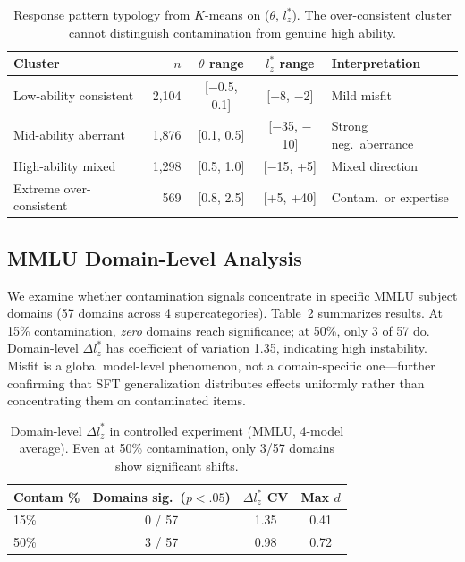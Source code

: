 \documentclass[11pt,a4paper]{article}
\begin{document}
\begin{table}[t]
\centering
\small
\begin{tabular}{lrccl}
\toprule
Cluster & $n$ & $\theta$ range & $l_{z}^{*}$ range & Interpretation \\
\midrule
Low-ability consistent & 2{,}104 & [$-$0.5, 0.1] & [$-$8, $-$2] & Mild misfit \\
Mid-ability aberrant & 1{,}876 & [0.1, 0.5] & [$-$35, $-$10] & Strong neg.\ aberrance \\
High-ability mixed & 1{,}298 & [0.5, 1.0] & [$-$15, +5] & Mixed direction \\
Extreme over-consistent & 569 & [0.8, 2.5] & [+5, +40] & Contam.\ or expertise \\
\bottomrule
\end{tabular}
\caption{Response pattern typology from $K$-means on ($\theta$, $l_{z}^{*}$). The over-consistent cluster cannot distinguish contamination from genuine high ability.}
\label{tab:typology}
\end{table}

\subsection{MMLU Domain-Level Analysis}

We examine whether contamination signals concentrate in specific MMLU subject domains (57 domains across 4 supercategories).
Table~\ref{tab:domain} summarizes results.
At 15\% contamination, \emph{zero} domains reach significance; at 50\%, only 3 of 57 do.
Domain-level $\Delta l_{z}^{*}$ has coefficient of variation 1.35, indicating high instability.
Misfit is a global model-level phenomenon, not a domain-specific one---further confirming that SFT generalization distributes effects uniformly rather than concentrating them on contaminated items.

\begin{table}[t]
\centering
\small
\begin{tabular}{lccc}
\toprule
Contam \% & Domains sig.\ ($p<.05$) & $\Delta l_{z}^{*}$ CV & Max $d$ \\
\midrule
15\% & 0 / 57 & 1.35 & 0.41 \\
50\% & 3 / 57 & 0.98 & 0.72 \\
\bottomrule
\end{tabular}
\caption{Domain-level $\Delta l_{z}^{*}$ in controlled experiment (MMLU, 4-model average). Even at 50\% contamination, only 3/57 domains show significant shifts.}
\label{tab:domain}
\end{table}
\end{document}

